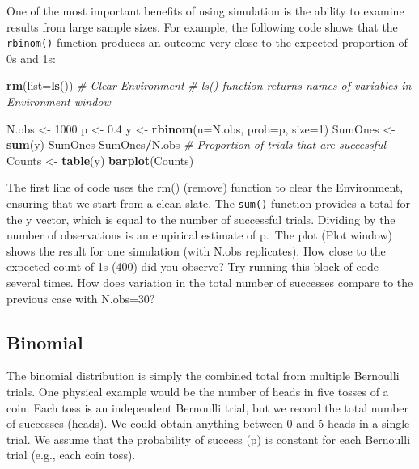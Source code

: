 \documentclass[
]{krantz}
\makeatletter
\newenvironment{Shaded}{\begin{snugshade}}{\end{snugshade}}
\newcommand{\AttributeTok}[1]{\textcolor[rgb]{0.27,0.27,0.27}{#1}}
\newcommand{\CommentTok}[1]{\textcolor[rgb]{0.37,0.37,0.37}{\textit{#1}}}
\newcommand{\DecValTok}[1]{\textcolor[rgb]{0.06,0.06,0.06}{#1}}
\newcommand{\FloatTok}[1]{\textcolor[rgb]{0.06,0.06,0.06}{#1}}
\newcommand{\FunctionTok}[1]{\textcolor[rgb]{0.27,0.27,0.27}{\textbf{#1}}}
\newcommand{\NormalTok}[1]{#1}
\newcommand{\OtherTok}[1]{\textcolor[rgb]{0.37,0.37,0.37}{#1}}
\newcommand{\SpecialCharTok}[1]{\textcolor[rgb]{0.43,0.43,0.43}{\textbf{#1}}}
\newenvironment{kframe}{%
\medskip{}
\setlength{\fboxsep}{.8em}
 \def\at@end@of@kframe{}%
 \ifinner\ifhmode%
  \def\at@end@of@kframe{\end{minipage}}%
  \begin{minipage}{\columnwidth}%
 \fi\fi%
 \def\FrameCommand##1{\hskip\@totalleftmargin \hskip-\fboxsep
 \colorbox{shadecolor}{##1}\hskip-\fboxsep
     \hskip-\linewidth \hskip-\@totalleftmargin \hskip\columnwidth}%
 \MakeFramed {\advance\hsize-\width
   \@totalleftmargin\z@ \linewidth\hsize
   \@setminipage}}%
 {\par\unskip\endMakeFramed%
 \at@end@of@kframe}
\renewenvironment{Shaded}{\begin{kframe}}{\end{kframe}}
\makeatother
\begin{document}
One of the most important benefits of using simulation is the ability to examine results from large sample sizes. For example, the following code shows that the \texttt{rbinom()} function produces an outcome very close to the expected proportion of 0s and 1s:

\begin{Shaded}
\begin{Highlighting}[]
\FunctionTok{rm}\NormalTok{(}\AttributeTok{list=}\FunctionTok{ls}\NormalTok{()) }\CommentTok{\# Clear Environment}
\CommentTok{\# ls() function returns names of variables in Environment window}

\NormalTok{N.obs }\OtherTok{\textless{}{-}} \DecValTok{1000}
\NormalTok{p }\OtherTok{\textless{}{-}} \FloatTok{0.4}
\NormalTok{y }\OtherTok{\textless{}{-}} \FunctionTok{rbinom}\NormalTok{(}\AttributeTok{n=}\NormalTok{N.obs, }\AttributeTok{prob=}\NormalTok{p, }\AttributeTok{size=}\DecValTok{1}\NormalTok{)}
\NormalTok{SumOnes }\OtherTok{\textless{}{-}} \FunctionTok{sum}\NormalTok{(y)}
\NormalTok{SumOnes}
\NormalTok{SumOnes}\SpecialCharTok{/}\NormalTok{N.obs }\CommentTok{\# Proportion of trials that are successful}
\NormalTok{Counts }\OtherTok{\textless{}{-}} \FunctionTok{table}\NormalTok{(y)}
\FunctionTok{barplot}\NormalTok{(Counts)}
\end{Highlighting}
\end{Shaded}

The first line of code uses the rm() (remove) function to clear the Environment, ensuring that we start from a clean slate. The \texttt{sum()} function provides a total for the y vector, which is equal to the number of successful trials. Dividing by the number of observations is an empirical estimate of p.~The plot (Plot window) shows the result for one simulation (with N.obs replicates). How close to the expected count of 1s (400) did you observe? Try running this block of code several times. How does variation in the total number of successes compare to the previous case with N.obs=30?

\hypertarget{BinomialDist}{%
\subsection{Binomial}\label{BinomialDist}}

The binomial distribution is simply the combined total from multiple Bernoulli trials. One physical example would be the number of heads in five tosses of a coin. Each toss is an independent Bernoulli trial, but we record the total number of successes (heads). We could obtain anything between 0 and 5 heads in a single trial. We assume that the probability of success (p) is constant for each Bernoulli trial (e.g., each coin toss).
\end{document}
